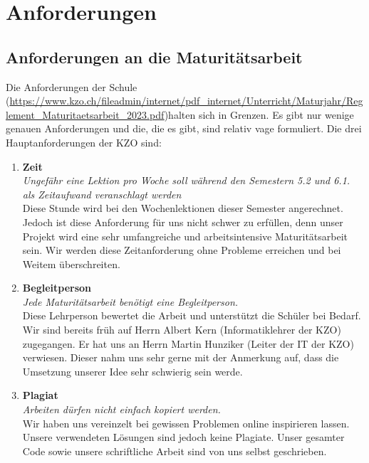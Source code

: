 \chapter{Anforderungen}

\section{Anforderungen an die Maturitätsarbeit}
Die Anforderungen der Schule (\url{https://www.kzo.ch/fileadmin/internet/pdf_internet/Unterricht/Maturjahr/Reglement_Maturitaetsarbeit_2023.pdf})halten sich in Grenzen. Es gibt nur wenige genauen Anforderungen
und die, die es gibt, sind relativ vage formuliert. Die drei Hauptanforderungen der KZO sind:
\begin{enumerate}
    \item \textbf{Zeit} \\
        \textit{Ungefähr eine Lektion pro Woche soll während den Semestern 5.2 und 6.1. als Zeitaufwand veranschlagt werden}\\Diese Stunde wird bei den Wochenlektionen dieser Semester angerechnet.
        Jedoch ist diese Anforderung für uns nicht schwer zu erfüllen, denn unser Projekt wird eine sehr umfangreiche und arbeitsintensive Maturitätsarbeit sein.
        Wir werden diese Zeitanforderung ohne Probleme erreichen und bei Weitem überschreiten.
    \item \textbf{Begleitperson} \\
        \textit{Jede Maturitätsarbeit benötigt eine Begleitperson. }\\Diese Lehrperson bewertet die Arbeit und unterstützt die Schüler bei Bedarf.
        Wir sind bereits früh auf Herrn Albert Kern (Informatiklehrer der KZO) zugegangen.
        Er hat uns an Herrn Martin Hunziker (Leiter der IT der KZO) verwiesen. Dieser nahm uns sehr gerne mit der Anmerkung auf, dass die Umsetzung unserer Idee sehr schwierig sein werde.
    \item \textbf{Plagiat} \\
        \textit{Arbeiten dürfen nicht einfach kopiert werden. }\\Wir haben uns vereinzelt bei gewissen Problemen online inspirieren lassen. Unsere verwendeten Lösungen sind jedoch keine Plagiate.
        Unser gesamter Code sowie unsere schriftliche Arbeit sind von uns selbst geschrieben.
\end{enumerate}

